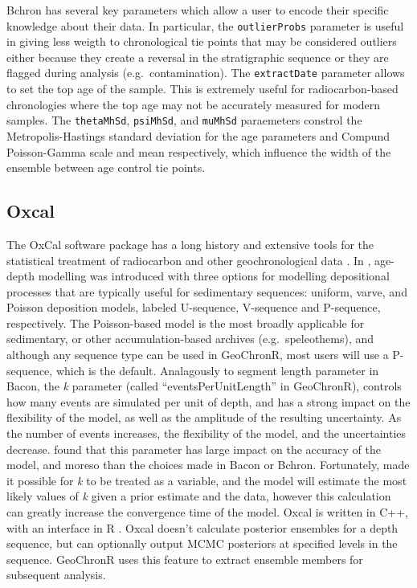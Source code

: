 \documentclass[gchron, manuscript]{copernicus}
\begin{document}
Bchron has several key parameters which allow a user to encode their specific knowledge about their data.
In particular, the \texttt{outlierProbs} parameter is useful in giving less weigth to chronological tie points that may be considered outliers either because they create a reversal in the stratigraphic sequence or they are flagged during analysis (e.g.~contamination).
The \texttt{extractDate} parameter allows to set the top age of the sample.
This is extremely useful for radiocarbon-based chronologies where the top age may not be accurately measured for modern samples.
The \texttt{thetaMhSd}, \texttt{psiMhSd}, and \texttt{muMhSd} paraemeters constrol the Metropolis-Hastings standard deviation for the age parameters and Compund Poisson-Gamma scale and mean respectively, which influence the width of the ensemble between age control tie points.

\subsection{Oxcal}

The OxCal software package has a long history and extensive tools for the statistical treatment of radiocarbon and other geochronological data \citep{BronkRamsey95}.
In \citet{ramsey2008deposition}, age-depth modelling was introduced with three options for modelling depositional processes that are typically useful for sedimentary sequences: uniform, varve, and Poisson deposition models, labeled U-sequence, V-sequence and P-sequence, respectively.
The Poisson-based model is the most broadly applicable for sedimentary, or other accumulation-based archives (e.g.~speleothems), and although any sequence type can be used in GeoChronR, most users will use a P-sequence, which is the default.
Analagously to segment length parameter in Bacon, the \emph{k} parameter (called ``eventsPerUnitLength'' in GeoChronR), controls how many events are simulated per unit of depth, and has a strong impact on the flexibility of the model, as well as the amplitude of the resulting uncertainty.
As the number of events increases, the flexibility of the model, and the uncertainties decrease.
\citet{trachsel2017} found that this parameter has large impact on the accuracy of the model, and moreso than the choices made in Bacon or Bchron.
Fortunately, \citet{bronkramsey2010} made it possible for \emph{k} to be treated as a variable, and the model will estimate the most likely values of \emph{k} given a prior estimate and the data, however this calculation can greatly increase the convergence time of the model.
Oxcal is written in C++, with an interface in R \citep{oxcAAR}.
Oxcal doesn't calculate posterior ensembles for a depth sequence, but can optionally output MCMC posteriors at specified levels in the sequence.
GeoChronR uses this feature to extract ensemble members for subsequent analysis.
\end{document}
